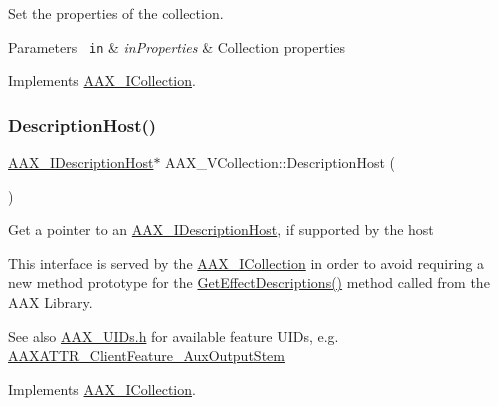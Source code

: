 Set the properties of the collection. 


\begin{DoxyParams}[1]{Parameters}
\mbox{\texttt{ in}}  & {\em in\+Properties} & Collection properties \\
\hline
\end{DoxyParams}


Implements \mbox{\hyperlink{a01777_a0cbb609eec2550f7db3a137a826ec436}{A\+A\+X\+\_\+\+I\+Collection}}.

\mbox{\label{a01897_a6d76c238644027f8622618d3e5cc4e44}} 
\subsubsection{\texorpdfstring{DescriptionHost()}{DescriptionHost()}\hspace{0.1cm}{\footnotesize\ttfamily [1/2]}}
{\footnotesize\ttfamily \mbox{\hyperlink{a01793}{A\+A\+X\+\_\+\+I\+Description\+Host}}$\ast$ A\+A\+X\+\_\+\+V\+Collection\+::\+Description\+Host (\begin{DoxyParamCaption}{ }\end{DoxyParamCaption})\hspace{0.3cm}{\ttfamily [virtual]}}





Get a pointer to an \mbox{\hyperlink{a01793}{A\+A\+X\+\_\+\+I\+Description\+Host}}, if supported by the host

This interface is served by the \mbox{\hyperlink{a01777}{A\+A\+X\+\_\+\+I\+Collection}} in order to avoid requiring a new method prototype for the \mbox{\hyperlink{a00796_gae0d356eef326f77cbb972e48946d4892}{Get\+Effect\+Descriptions()}} method called from the A\+AX Library.

\begin{DoxySeeAlso}{See also}
\mbox{\hyperlink{a00683}{A\+A\+X\+\_\+\+U\+I\+Ds.\+h}} for available feature U\+I\+Ds, e.\+g. \mbox{\hyperlink{a00683_aa6369eb43ac68152d30ec665de5ea603}{A\+A\+X\+A\+T\+T\+R\+\_\+\+Client\+Feature\+\_\+\+Aux\+Output\+Stem}} 
\end{DoxySeeAlso}


Implements \mbox{\hyperlink{a01777_aeed6374265a6c9b4c59f752644feba02}{A\+A\+X\+\_\+\+I\+Collection}}.

\mbox{\label{a01897_ac26e17d7bd1ec4be3bd178fdd0ff9be6}} 
